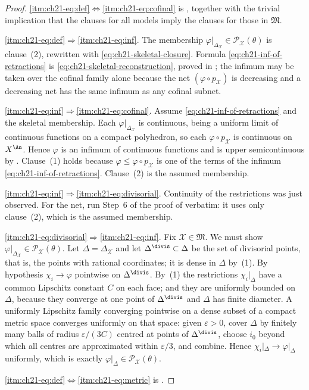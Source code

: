 \begin{proof}
\cref{itm:ch21-eq:def}\(\Leftrightarrow\)\cref{itm:ch21-eq:cofinal} is
, together with the trivial
implication that the clauses for all models imply the clauses for those in
\(\mathfrak M\).

\cref{itm:ch21-eq:def}\(\Rightarrow\)\cref{itm:ch21-eq:inf}.  The membership
\(\varphi|_{\Delta_{\mathcal X}}\in\mathcal P_{\mathcal X}(\theta)\) is
clause~(2), rewritten with \eqref{eq:ch21-skeletal-closure}.  Formula
\eqref{eq:ch21-inf-of-retractions} is
\eqref{eq:ch21-skeletal-reconstruction}, proved in
; the infimum may be taken over the
cofinal family alone because the net \((\varphi\circ p_{\mathcal X})\) is
decreasing and a decreasing net has the same infimum as any cofinal
subnet.

\cref{itm:ch21-eq:inf}\(\Rightarrow\)\cref{itm:ch21-eq:cofinal}.  Assume
\eqref{eq:ch21-inf-of-retractions} and the skeletal membership.  Each
\(\varphi|_{\Delta_{\mathcal X}}\) is continuous, being a uniform limit of
continuous functions on a compact polyhedron, so each
\(\varphi\circ p_{\mathcal X}\) is continuous on \(X^{\An}\).  Hence
\(\varphi\) is an infimum of continuous functions and is upper
semicontinuous by .  Clause~(1) holds because
\(\varphi\leq\varphi\circ p_{\mathcal X}\) is one of the terms of the
infimum \eqref{eq:ch21-inf-of-retractions}.  Clause~(2) is the assumed
membership.

\cref{itm:ch21-eq:inf}\(\Rightarrow\)\cref{itm:ch21-eq:divisorial}.
Continuity of the restrictions was just observed.  For the net, run Step~6
of the proof of  verbatim: it uses only
clause~(2), which is the assumed membership.

\cref{itm:ch21-eq:divisorial}\(\Rightarrow\)\cref{itm:ch21-eq:inf}.  Fix
\(\mathcal X\in\mathfrak M\).  We must show
\(\varphi|_{\Delta_{\mathcal X}}\in\mathcal P_{\mathcal X}(\theta)\).  Let
\(\Delta=\Delta_{\mathcal X}\) and let \(\Delta^{\divis}\subset\Delta\) be
the set of divisorial points, that is, the points with rational
coordinates; it is dense in \(\Delta\) by
\,(1).  By hypothesis
\(\chi_i\to\varphi\) pointwise on \(\Delta^{\divis}\).  By
\,(1) the restrictions
\(\chi_i|_\Delta\) have a common Lipschitz constant \(C\) on each face; and
they are uniformly bounded on \(\Delta\), because they converge at one
point of \(\Delta^{\divis}\) and \(\Delta\) has finite diameter.  A
uniformly Lipschitz family converging pointwise on a dense subset of a
compact metric space converges uniformly on that space: given
\(\varepsilon>0\), cover \(\Delta\) by finitely many balls of radius
\(\varepsilon/(3C)\) centred at points of \(\Delta^{\divis}\), choose
\(i_0\) beyond which all centres are approximated within
\(\varepsilon/3\), and combine.  Hence
\(\chi_i|_\Delta\to\varphi|_\Delta\) uniformly, which is exactly
\(\varphi|_\Delta\in\mathcal P_{\mathcal X}(\theta)\).

\cref{itm:ch21-eq:def}\(\Leftrightarrow\)\cref{itm:ch21-eq:metric} is
.
\end{proof}

